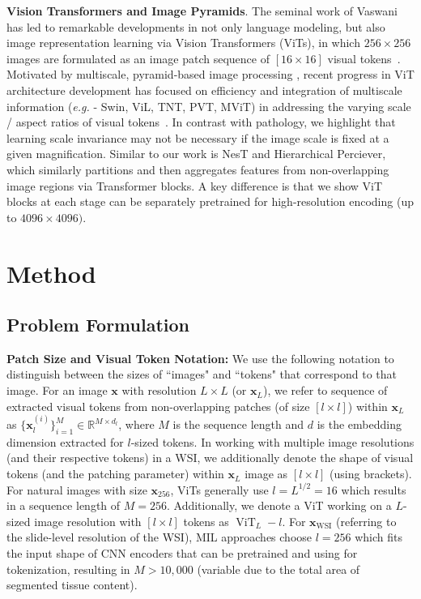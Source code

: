 {\textbf{Vision Transformers and Image Pyramids}. The seminal work of Vaswani \etal has led to remarkable developments in not only language modeling, but also image representation learning via Vision Transformers (ViTs), in which $256 \times 256$ images are formulated as an image patch sequence of $[16 \times 16]$ visual tokens~\cite{vaswani2017attention, dosovitskiy2021image, touvron2021training}. Motivated by multiscale, pyramid-based image processing \cite{rosenfeld1971edge, burt1987laplacian, koenderink1984structure}, recent progress in ViT architecture development has focused on efficiency and integration of multiscale information (\textit{e.g.} - Swin, ViL, TNT, PVT, MViT) in addressing the varying scale / aspect ratios of visual tokens~\cite{han2021transformer, zhang2021multi, liu2021swin, wang2021pyramid, fan2021multiscale}. In contrast with pathology, we highlight that learning scale invariance may not be necessary if the image scale is fixed at a given magnification. Similar to our work is NesT and Hierarchical Perciever, which similarly partitions and then aggregates features from non-overlapping image regions via Transformer blocks\cite{zhang2022nested, carreira2022hierarchical}. A key difference is that we show ViT blocks at each stage can be separately pretrained for high-resolution encoding (up to $4096 \times 4096)$.

\section{Method}
\subsection{Problem Formulation}
 \textbf{Patch Size and Visual Token Notation:}  We use the following notation to distinguish between the sizes of ``images" and ``tokens" that correspond to that image. For an image $\textbf{x}$ with resolution $L \times L$ (or $\textbf{x}_L$), we refer to sequence of extracted visual tokens from non-overlapping patches (of size $[l \times l]$) within $\textbf{x}_L$ as $\{\textbf{x}_{l}^{(i)}\}_{i=1}^{M} \in \mathbb{R}^{M \times d_{l}}$, where $M$ is the sequence length and $d$ is the embedding dimension extracted for $l$-sized tokens. In working with multiple image resolutions (and their respective tokens) in a WSI, we additionally denote the shape of visual tokens (and the patching parameter) within $\textbf{x}_L$ image as $[l \times l]$ (using brackets). For natural images with size $\textbf{x}_{256}$, ViTs generally use $l = L^{1/2} =16$ which results in a sequence length of $M=256$. Additionally, we denote a ViT working on a $L$-sized image resolution with $[l \times l]$ tokens as $\operatorname{ViT}_L-l$. For $\textbf{x}_{\text{WSI}}$ (referring to the slide-level resolution of the WSI), MIL approaches choose $l = 256$ which fits the input shape of CNN encoders that can be pretrained and using for tokenization, resulting in $M > 10,000$ (variable due to the total area of segmented tissue content).

}
